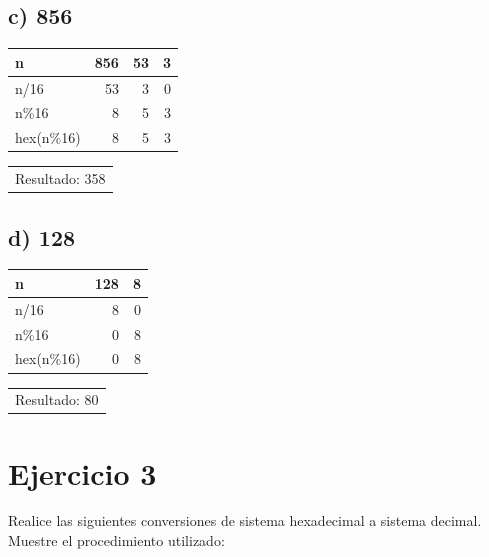 \documentclass[12pt]{article}
\begin{document}
\subsection*{c) 856}
\label{sec:orgd8ad4dd}
\begin{mdframed}
\begin{center}
\begin{tabular}{lrrr}
n & 856 & 53 & 3\\
\hline
n/16 & 53 & 3 & 0\\
n\%16 & 8 & 5 & 3\\
hex(n\%16) & 8 & 5 & 3\\
\end{tabular}
\end{center}

\begin{center}
\begin{tabular}{l}
Resultado: 358\\
\end{tabular}
\end{center}
\end{mdframed}

\subsection*{d) 128}
\label{sec:org7c05df6}
\begin{mdframed}
\begin{center}
\begin{tabular}{lrr}
n & 128 & 8\\
\hline
n/16 & 8 & 0\\
n\%16 & 0 & 8\\
hex(n\%16) & 0 & 8\\
\end{tabular}
\end{center}

\begin{center}
\begin{tabular}{l}
Resultado: 80\\
\end{tabular}
\end{center}
\end{mdframed}

\section*{Ejercicio 3}
\label{sec:orga74320b}
Realice las siguientes conversiones de sistema hexadecimal a sistema decimal. Muestre el procedimiento utilizado:
\end{document}
